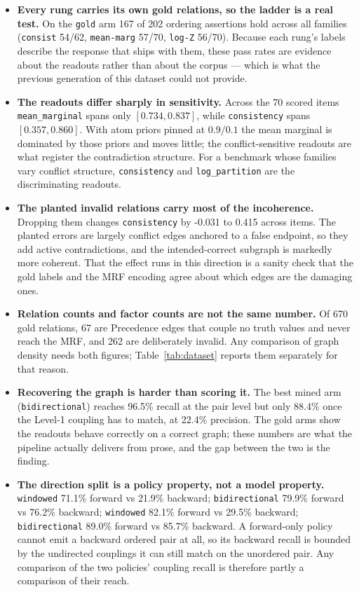 \documentclass[11pt]{article}
\begin{document}
\begin{itemize}
\item \textbf{Every rung carries its own gold relations, so the ladder is a real test.} On the \texttt{gold} arm 167 of 202 ordering assertions hold across all families (\texttt{consist} 54/62, \texttt{mean-marg} 57/70, \texttt{log-Z} 56/70). Because each rung's labels describe the response that ships with them, these pass rates are evidence about the readouts rather than about the corpus --- which is what the previous generation of this dataset could not provide.
\item \textbf{The readouts differ sharply in sensitivity.} Across the 70 scored items \texttt{mean\_marginal} spans only $[0.734, 0.837]$, while \texttt{consistency} spans $[0.357, 0.860]$. With atom priors pinned at $0.9/0.1$ the mean marginal is dominated by those priors and moves little; the conflict-sensitive readouts are what register the contradiction structure. For a benchmark whose families vary conflict structure, \texttt{consistency} and \texttt{log\_partition} are the discriminating readouts.
\item \textbf{The planted invalid relations carry most of the incoherence.} Dropping them changes \texttt{consistency} by -0.031 to 0.415 across items. The planted errors are largely conflict edges anchored to a false endpoint, so they add active contradictions, and the intended-correct subgraph is markedly more coherent. That the effect runs in this direction is a sanity check that the gold labels and the MRF encoding agree about which edges are the damaging ones.
\item \textbf{Relation counts and factor counts are not the same number.} Of 670 gold relations, 67 are Precedence edges that couple no truth values and never reach the MRF, and 262 are deliberately invalid. Any comparison of graph density needs both figures; Table~\ref{tab:dataset} reports them separately for that reason.
\item \textbf{Recovering the graph is harder than scoring it.} The best mined arm (\texttt{bidirectional}) reaches 96.5\% recall at the pair level but only 88.4\% once the Level-1 coupling has to match, at 22.4\% precision. The gold arms show the readouts behave correctly on a correct graph; these numbers are what the pipeline actually delivers from prose, and the gap between the two is the finding.
\item \textbf{The direction split is a policy property, not a model property.} \texttt{windowed} 71.1\% forward vs 21.9\% backward; \texttt{bidirectional} 79.9\% forward vs 76.2\% backward; \texttt{windowed} 82.1\% forward vs 29.5\% backward; \texttt{bidirectional} 89.0\% forward vs 85.7\% backward. A forward-only policy cannot emit a backward ordered pair at all, so its backward recall is bounded by the undirected couplings it can still match on the unordered pair. Any comparison of the two policies' coupling recall is therefore partly a comparison of their reach.

\end{itemize}
\end{document}

